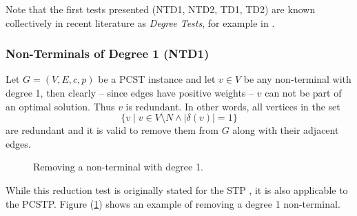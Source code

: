  Note that the first tests presented (NTD1, NTD2, TD1, TD2) are known collectively
 in recent literature as \textit{Degree Tests}, for example in \cite{rehfeldt2016reduction}.
\subsubsection{Non-Terminals of Degree 1 (NTD1)}
\label{sec:red:test:deg1}
Let $G = (V, E, c, p)$ be a PCST instance and let $v \in V$ be any non-terminal with degree 1, then
 clearly -- since edges have positive weights -- $v$ can not be part of an optimal solution. Thus $v$ is redundant. In other words,
 all vertices in the set
 $$\{v \mid v \in V \setminus N \wedge |\delta(v)| = 1\}$$
 are redundant and it is valid to remove them from $G$ along with their adjacent edges.

\begin{figure}[h]\centering
  \caption{Removing a non-terminal with degree 1.}
  \label{fig:red:test:deg1}
\end{figure}

 While this reduction test is originally stated for the STP \citep{hwang1992steiner}, it is also applicable to the PCSTP. Figure (\ref{fig:red:test:deg1})
  shows an example of removing a degree 1 non-terminal.


